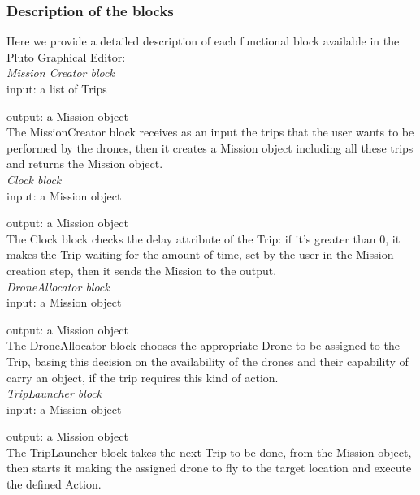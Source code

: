 \subsubsection {Description of the blocks}\label{blocks}

Here we provide a detailed description of each functional block available in the Pluto Graphical Editor:
\\

\textit{Mission Creator block}
\\

input: a list of Trips

output: a Mission object
\\

The MissionCreator block receives as an input the trips that the user wants to be performed by the drones, then it creates a Mission object including all these trips and returns the Mission object.
\\



\textit{Clock block}
\\

input: a Mission object

output: a Mission object
\\

The Clock block checks the delay attribute of the Trip: if it's greater than 0, it makes the Trip waiting for the amount of time, set by the user in the Mission creation step, then it sends the Mission to the output.
\\

\textit{DroneAllocator block}
\\

input: a Mission object

output: a Mission object
\\

The DroneAllocator block chooses the appropriate Drone to be assigned to the Trip, basing this decision on the availability of the drones and their capability of carry an object, if the trip requires this kind of action.
\\

\textit{TripLauncher block}
\\

input: a Mission object

output: a Mission object
\\
The TripLauncher block takes the next Trip to be done, from the Mission object, then starts it making the assigned drone to fly to the target location and execute the defined Action.
\\

